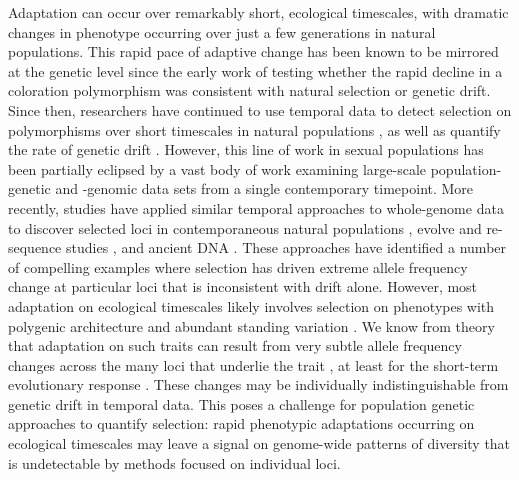 \documentclass[11pt]{article}
\begin{document}
Adaptation can occur over remarkably short, ecological timescales, with
dramatic changes in phenotype occurring over just a few generations in natural
populations. This rapid pace of adaptive change has been known to be mirrored
at the genetic level since the early work of \textcite{Fisher1947-tf}  testing
whether the rapid decline in a coloration polymorphism was consistent with
natural selection or genetic drift. Since then, researchers have continued to
use temporal data to detect selection on polymorphisms over short timescales in
natural populations
\parencite{Kettlewell1958-or,Kettlewell1961-ok,Fisher1947-tf,Dobzhansky1943-lh,Dobzhansky1971-vf,Mueller1985-eo},
as well as quantify the rate of genetic drift
\parencite{Nei1981-oy,Pollak1983-xh,Mueller1985-eg,Waples1989-sj,Wang2003-ev}.
However, this line of work in sexual populations has been partially eclipsed by
a vast body of work examining large-scale population-genetic and -genomic data
sets from a single contemporary timepoint. More recently, studies have applied
similar temporal approaches to whole-genome data to discover selected loci in
contemporaneous natural populations
\parencite{Bergland2014-ij,Rajpurohit2018-od}, evolve and re-sequence studies
\parencite{Burke2010-tz,Johansson2010-ya,Teotonio2009-sa,Turner2011-sx,Turner2012-bm,Franssen2017-lx,Orozco-terWengel2012-fu},
and ancient DNA \parencite{Mathieson2015-uw,Fu2016-ek}. These approaches have
identified a number of compelling examples where selection has driven extreme
allele frequency change at particular loci that is inconsistent with drift
alone. However, most adaptation on ecological timescales likely involves
selection on phenotypes with polygenic architecture and abundant standing
variation \parencite{Endler1986-wd,Hendry1999-zu,Kinnison2001-vb,Kopp2009-pj}.
We know from theory that adaptation on such traits can result from very subtle
allele frequency changes across the many loci that underlie the trait
\parencite{Bulmer1980-zo}, at least for the short-term evolutionary response
\parencite{Jain2017-mw,Jain2015-xy,Thornton2018-eo,Chevin2008-lt,Hermisson2005-hs}.
These changes may be individually indistinguishable from genetic drift in
temporal data. This poses a challenge for population genetic approaches to
quantify selection: rapid phenotypic adaptations occurring on ecological
timescales may leave a signal on genome-wide patterns of diversity that is
undetectable by methods focused on individual loci.
\end{document}
